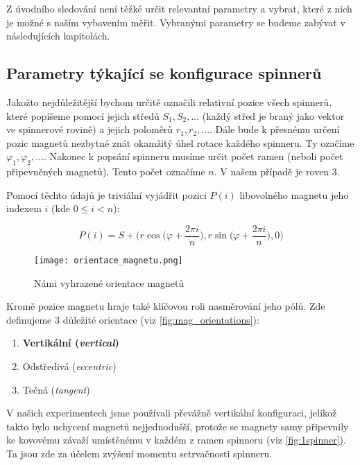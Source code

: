 Z úvodního sledování není těžké určit relevantní parametry a vybrat, které z nich je možné s naším vybavením měřit. Vybranými parametry se budeme zabývat v následujících kapitolách.

\subsection{Parametry týkající se konfigurace spinnerů}
\label{sub:param_konf}
Jakožto nejdůležitější bychom určitě označili relativní pozice všech spinnerů, které popíšeme pomocí jejich středů $S_1, S_2,...$ (každý střed je braný jako vektor ve spinnerové rovině) a jejich poloměrů $r_1, r_2, ...$.
Dále bude k přesnému určení pozic magnetů nezbytné znát okamžitý úhel rotace každého spinneru. Ty ozačíme $\varphi_1, \varphi_2,...$.
Nakonec k popsání spinneru musíme určit počet ramen (neboli počet připevněných magnetů). Tento počet označíme $n$. V našem případě je roven 3.

Pomocí těchto údajů je triviální vyjádřit pozici $P(i)$ libovolného magnetu jeho indexem $i$ (kde $0 \leq i < n$):

\begin{equation}
    \label{eq:magnet_pos}
    P(i) = S + \biggr(r\cos{\bigg(\varphi + \frac{2\pi i}{n}\bigg)},
    r\sin{\bigg(\varphi+\frac{2\pi i}{n}}\bigg), 0 \bigg)
\end{equation}

\begin{wrapfigure}{r}{0.4\textwidth}
    \vspace*{-0.5cm}
    \texttt{[image: orientace\_magnetu.png]}
    \centering
    \caption{Námi vyhrazené orientace magnetů}
    \label{fig:mag_orientations}
\end{wrapfigure}

Kromě pozice magnetu hraje také klíčovou roli nasměrování jeho pólů. Zde definujeme 3 důležité orientace (viz \autoref{fig:mag_orientations}):

\begin{enumerate}[topsep=0pt, partopsep=0pt]
    \setlength{\itemsep}{0pt}%
    \setlength{\parskip}{0pt}%
    \item \textbf{Vertikální (\textit{vertical})}
    \item Odstředivá (\textit{eccentric})
    \item Tečná (\textit{tangent})
\end{enumerate}

V našich experimentech jsme používali převážně vertikální konfiguraci, jelikož takto bylo uchycení magnetů nejjednodušší, protože se magnety samy připevnily ke kovovému závaží umístěnému v každém z ramen spinneru (viz \autoref{fig:1spinner}). Ta jsou zde za účelem zvýšení momentu setrvačnosti spinneru.

